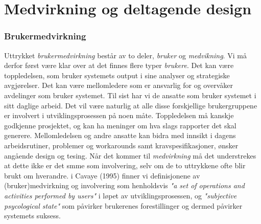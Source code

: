 \section{Medvirkning og deltagende design}
\label{chp: medvirkning}

\subsubsection{Brukermedvirkning}

Uttrykket \emph{brukermedvirkning} består av to deler, \emph{bruker} og \emph{medvikning}. Vi må derfor først være klar over at det finnes flere typer \emph{brukere}. Det kan være toppledelsen, som bruker systemets output i sine analyser og strategiske avgjørelser. Det kan være mellomledere som er ansvarlig for og overvåker avdelinger som bruker systemet. Til sist har vi de ansatte som bruker systemet i sitt daglige arbeid. Det vil være naturlig at alle disse forskjellige brukergruppene er involvert i utviklingsprosessen på noen måte. Toppledelsen må kanskje godkjenne prosjektet, og kan ha meninger om hva slags rapporter det skal generere. Mellomledelsen og andre ansatte kan bidra med innsikt i dagens arbeidsrutiner, problemer og workarounds samt kravspesifikasjoner, ønsker angående design og tesing. Når det kommer til \emph{medvirkning} må det understrekes at dette ikke er det smme som involvering, selv om de to uttrykkene ofte blir brukt om hverandre. i Cavaye (1995) finner vi definisjonene av (bruker)medvirkning og involvering som henholdsvis \emph{"a set of operations and activities performed by users"} i løpet av utviklingsprosessen, og \emph{"subjective psycological state"} som påvirker brukerenes forestillinger og dermed påvirker systemets suksess.

